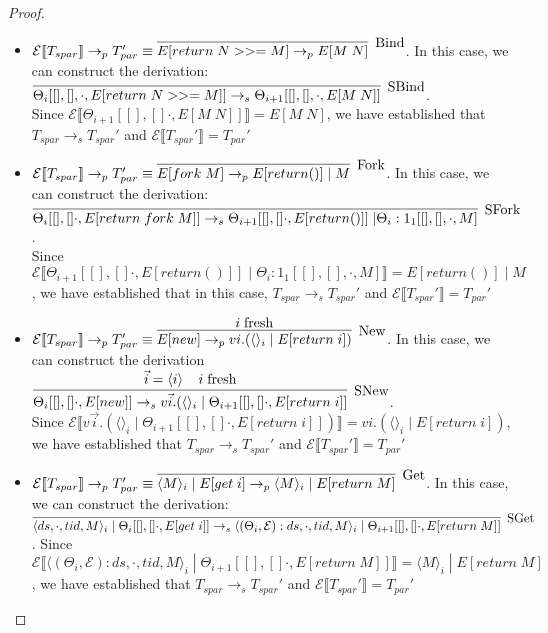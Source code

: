 \documentclass[9pt]{article}
\newcommand\specStep{\rightarrow_{s}}
\newcommand\parStep{\rightarrow_{p}}
\newcommand{\eval}[1]{E[#1]}
\newcommand{\erase}[1]{\mathcal{E}\llbracket #1 \rrbracket}
\begin{document}
\begin{proof}
\begin{itemize}
\item $\erase{T_{spar} }\parStep T_{par}' \equiv \infer[\text{Bind}]{\eval{return \; N >>= M} \parStep \eval{M \; N}}{}$.  In this case, we can construct the derivation: $\infer[\text{SBind}]{ \Theta_i[[], [], \cdot, \eval{return \; N >>= M}] \specStep \Theta_{i+1}[[], [], \cdot, \eval{M \; N}]}{}$.\\  Since $\erase{\Theta_{i+1}[[], [] \cdot, \eval{M \; N}]} = \eval{M \; N}$, we have established that $T_{spar} \specStep T_{spar}'$ and $\erase{T_{spar}'} = T_{par}'$

\item $\erase{T_{spar} }\parStep T_{par}' \equiv \infer[\text{Fork}]{\eval{fork \; M} \parStep \eval{return()} \; | \; M}{}$.  In this case, we can construct the derivation: $\infer[\text{SFork}]{\Theta_i[[], [] \cdot, \eval{return \; fork \; M}] \specStep \Theta_{i+1}[[], [] \cdot, \eval{return()}] \; | \Theta_i : 1_1[[], [], \cdot, M]}{}$.\\  Since $\erase{\Theta_{i+1}[[], [] \cdot, \eval{return()}] \; | \; \Theta_i : 1_1[[], [], \cdot, M]} = \eval{return()} \; | \; M$, we have established that in this case, $T_{spar} \specStep T_{spar}'$ and $\erase{T_{spar}'} = T_{par}'$

\item $\erase{T_{spar} }\parStep T_{par}' \equiv \infer[\text{New}]{\eval{new} \parStep vi.(\langle\rangle_i \; | \; \eval{return \; i})}{i \; \text{fresh}}$.  In this case, we can construct the derivation $\infer[\text{SNew}]{\Theta_i[[], [] \cdot, \eval{new}] \specStep v\vec{i}.(\langle\rangle_i \; | \; \Theta_{i+1}[[], [] \cdot, \eval{return \; i}]}{\vec{i} = \langle i \rangle \;\;\;\; i \; \text{fresh}}$.\\  Since $\erase{v\vec{i}.(\langle\rangle_i \; | \; \Theta_{i+1}[[], [] \cdot, \eval{return \; i}])} =  vi.(\langle\rangle_i \; | \; \eval{return \; i})$, we have established that $T_{spar} \specStep T_{spar}'$ and $\erase{T_{spar}'} = T_{par}'$

\item $\erase{T_{spar} }\parStep T_{par}' \equiv \infer[\text{Get}]{\langle M\rangle_i \; | \; \eval{get \; i} \parStep \langle M\rangle_i \; | \; \eval{return \; M}}{}$.  In this case, we can construct the derivation: \\$\infer[\text{SGet}]{\langle ds, \cdot, tid, M\rangle_i \; | \; \Theta_i[[], [] \cdot, \eval{get \; i}] \specStep \langle(\Theta_i, \mathcal{E}) : ds, \cdot, tid, M\rangle_i \; | \; \Theta_{i+1}[[], [] \cdot, \eval{return \; M}]}{}$.  Since $\erase{\langle(\Theta_i, \mathcal{E}) : ds, \cdot, tid, M\rangle_i \; | \; \Theta_{i+1}[[], [] \cdot, \eval{return \; M}]} =  \langle M \rangle_i \; | \; \eval{return \; M}$, we have established that $T_{spar} \specStep T_{spar}'$ and $\erase{T_{spar}'} = T_{par}'$


\end{itemize}
\end{proof}
\end{document}
